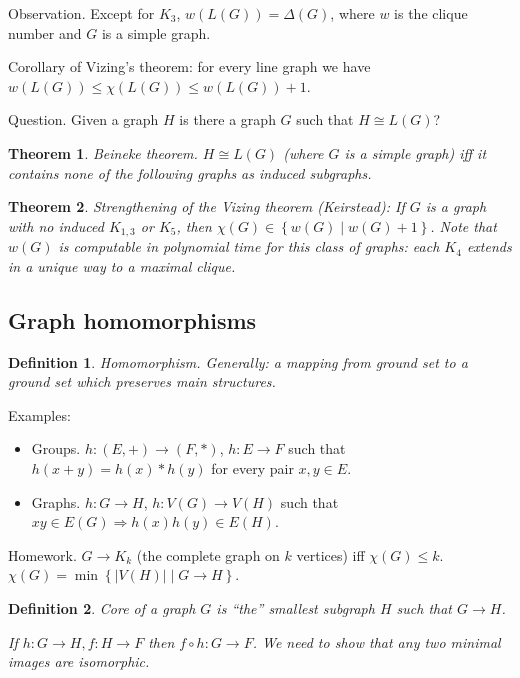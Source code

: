 \documentclass[12pt,a4paper]{article}
\newtheorem{theorem}{Theorem}
\newtheorem{definition}{Definition}
\begin{document}
Observation.  Except for \(K_3\), \(w(L(G)) = \Delta(G)\), where \(w\) is the
clique number and \(G\) is a simple graph.

Corollary of Vizing's theorem: for every line graph we have \(w(L(G)) \leq
\chi(L(G)) \leq w(L(G)) + 1\).

Question. Given a graph \(H\) is there a graph \(G\) such that \(H \cong L(G)\)?

\begin{theorem}
  Beineke theorem.
  \(H \cong L(G)\) (where \(G\) is a simple graph) iff it contains none of the
  following graphs as induced subgraphs.
\end{theorem}

\begin{theorem}
  Strengthening of the Vizing theorem (Keirstead): If \(G\) is a graph with no
  induced \(K_{1,3}\) or \(K_5\), then
  \(\chi(G) \in \left\{w(G) \middle| w(G) + 1\right\}\).  Note that \(w(G)\) is
  computable in polynomial time for this class of graphs: each \(K_4\) extends
  in a unique way to a maximal clique.
\end{theorem}

\subsection{Graph homomorphisms}

\begin{definition}
  Homomorphism.  Generally: a mapping from ground set to a ground set which
  preserves main structures.
\end{definition}

Examples:
\begin{itemize}
\item Groups. \(h: (E, +) \to (F, *)\), \(h: E \to F\) such that
  \(h(x + y) = h(x) * h(y)\) for every pair \(x, y \in E\).
\item Graphs. \(h: G \to H\), \(h: V(G) \to V(H)\) such that \(xy \in E(G)
  \Rightarrow h(x)h(y) \in E(H)\).
\end{itemize}

Homework. \(G \to K_k\) (the complete graph on \(k\) vertices) iff \(\chi(G)
\leq k\). \(\chi(G) = \min\left\{|V(H)| \middle| G \to H\right\}\).

\begin{definition}
  Core of a graph \(G\) is \enquote{the} smallest subgraph \(H\) such that \(G
  \to H\).

  If \(h: G \to H, f: H \to F\) then \(f \circ h: G \to F\).  We need to show
  that any two minimal images are isomorphic.
\end{definition}
\end{document}
